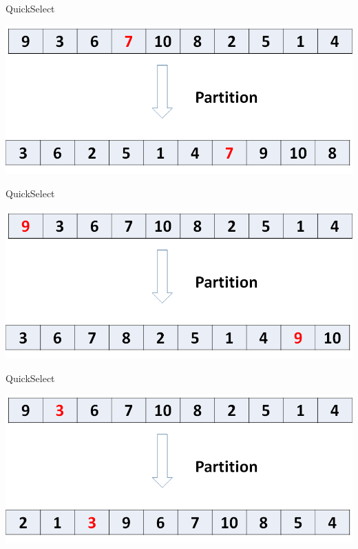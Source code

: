 \documentclass{beamer}
\begin{document}
\begin{frame}{QuickSelect}
\begin{center}
    \includegraphics[scale=0.4]{quickSelectCase1.png}
\end{center}
\end{frame}



\begin{frame}{QuickSelect}
\begin{center}
    \includegraphics[scale=0.4]{quickSelectCase2.png}
\end{center}
\end{frame}



\begin{frame}{QuickSelect}
\begin{center}
    \includegraphics[scale=0.4]{quickSelectCase3.png}
\end{center}
\end{frame}
\end{document}
